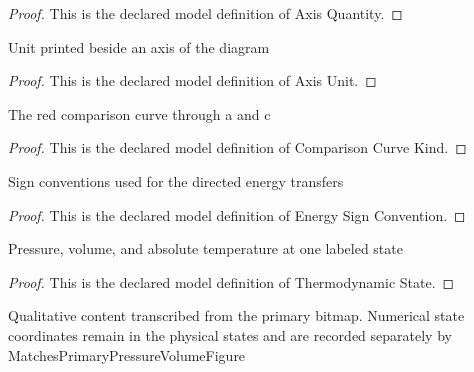 \begin{proof}
  This is the declared model definition of Axis Quantity.
\end{proof}
\begin{definition}
  \label{def:physics:phyx-mini-0492:phyxminiproblems-problemphyxmini0492-axisunit}
  Unit printed beside an axis of the diagram
\end{definition}
\begin{proof}
  This is the declared model definition of Axis Unit.
\end{proof}
\begin{definition}
  \label{def:physics:phyx-mini-0492:phyxminiproblems-problemphyxmini0492-comparisoncurvekind}
  The red comparison curve through a and c
\end{definition}
\begin{proof}
  This is the declared model definition of Comparison Curve Kind.
\end{proof}
\begin{definition}
  \label{def:physics:phyx-mini-0492:phyxminiproblems-problemphyxmini0492-energysignconvention}
  Sign conventions used for the directed energy transfers
\end{definition}
\begin{proof}
  This is the declared model definition of Energy Sign Convention.
\end{proof}
\begin{definition}
  \label{def:physics:phyx-mini-0492:phyxminiproblems-problemphyxmini0492-thermodynamicstate}
  Pressure, volume, and absolute temperature at one labeled state
\end{definition}
\begin{proof}
  This is the declared model definition of Thermodynamic State.
\end{proof}
\begin{definition}
  \label{def:physics:phyx-mini-0492:phyxminiproblems-problemphyxmini0492-pressurevolumefigure}
  Qualitative content transcribed from the primary bitmap. Numerical state coordinates remain in the physical states and are recorded separately by MatchesPrimaryPressureVolumeFigure
\end{definition}

